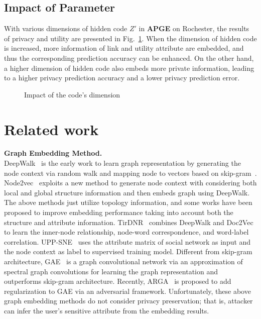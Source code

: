 \documentclass{article}
\begin{document}
\subsection{Impact of Parameter}
With various dimensions of hidden code $Z'$ in \textbf{APGE} on Rochester, the results of privacy and utility are presented in Fig.~\ref{fig:Impact}. When the dimension of hidden code is increased, more information of link and utility attribute are embedded, and thus the corresponding prediction accuracy can be enhanced. On the other hand, a higher dimension of hidden code also embeds more private information, leading to a higher privacy prediction accuracy and a lower privacy prediction error.
%
\begin{figure}[!ht]
     \hfill
     \caption{Impact of the code's dimension }
     \label{fig:Impact}
   \end{figure}




\section{Related work}

\textbf{Graph Embedding Method.}\\
DeepWalk~\citep{perozzi2014deepwalk} is the early work to learn graph representation by generating the node context via random walk and mapping node to vectors based on skip-gram~\citep{mikolov2013efficient}. 
Node2vec~\citep{grover2016node2vec} exploits a new method to generate node context with considering both local and global structure information and then embeds graph using DeepWalk. 
The above methods just utilize topology information, and some works have been proposed to improve embedding performance taking into account both the structure and attribute information.
TirDNR~\citep{pan2016tri} combines DeepWalk and Doc2Vec~\citep{dai2015document} to learn the inner-node relationship, node-word correspondence, and word-label correlation. 
UPP-SNE~\citep{zhang2017user} uses the attribute matrix of social network as input and the node context as label to supervised training model. 
Different from skip-gram architecture, GAE~\citep{kipf2016variational} is a graph convolutional network via an approximation of spectral graph convolutions for learning the graph representation and outperforms skip-gram architecture. 
Recently, ARGA~\citep{pan2018adversarially} is proposed to add regularization to GAE via an adversarial framework.
Unfortunately, these above graph embedding methods do not consider privacy preservation; that is, attacker can infer the user's sensitive attribute from the embedding results.
\end{document}
